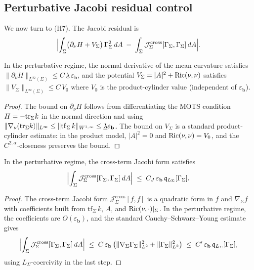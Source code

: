 \subsection{Perturbative Jacobi residual control}

We now turn to (H7). The Jacobi residual is
\[
    \Bigl|\int_\Sigma\bigl(\partial_\nu H + V_\Sigma\bigr)\,\Gamma_\Sigma^2\,dA
    \;-\;\int_\Sigma\mathcal J_\Sigma^{\mathrm{cross}}[\Gamma_\Sigma,\Gamma_\Sigma]\,dA\Bigr|.
\]

\begin{lemma}\label{lem:PerturbativeNuHBound}
In the perturbative regime, the normal derivative of the mean curvature satisfies $\|\partial_\nu H\|_{L^\infty(\Sigma)}\le C\,\underline\lambda\,\varepsilon_{\mathbf b}$, and the potential $V_\Sigma=|A|^2+\mathrm{Ric}(\nu,\nu)$ satisfies $\|V_\Sigma\|_{L^\infty(\Sigma)}\le C\,V_0$ where $V_0$ is the product-cylinder value (independent of $\varepsilon_{\mathbf b}$).
\end{lemma}

\begin{proof}
The bound on $\partial_\nu H$ follows from differentiating the MOTS condition $H=-\mathrm{tr}_\Sigma k$ in the normal direction and using $\|\nabla_\nu(\mathrm{tr}_\Sigma k)\|_{L^\infty}\le\|\mathrm{tf}_\Sigma\,k\|_{W^{1,\infty}}\le\underline\lambda\varepsilon_{\mathbf b}$. The bound on $V_\Sigma$ is a standard product-cylinder estimate: in the product model, $|A|^2=0$ and $\mathrm{Ric}(\nu,\nu)=V_0$, and the $C^{2,\alpha}$-closeness preserves the bound.
\end{proof}

\begin{lemma}\label{lem:PerturbativeCrossBound}
In the perturbative regime, the cross-term Jacobi form satisfies
\begin{equation}\label{eq:PerturbativeCrossBound}
    \Bigl|\int_\Sigma\mathcal J_\Sigma^{\mathrm{cross}}[\Gamma_\Sigma,\Gamma_\Sigma]\,dA\Bigr|
    \;\le\;
    C_J\,\varepsilon_{\mathbf b}\,\mathfrak q_{L_\Sigma}[\Gamma_\Sigma] .
\end{equation}
\end{lemma}

\begin{proof}
The cross-term Jacobi form $\mathcal J_\Sigma^{\mathrm{cross}}[f,f]$ is a quadratic form in $f$ and $\nabla_\Sigma f$ with coefficients built from $\mathrm{tf}_\Sigma\,k$, $A$, and $\mathrm{Ric}(\nu,\cdot)|_\Sigma$. In the perturbative regime, the coefficients are $O(\varepsilon_{\mathbf b})$, and the standard Cauchy--Schwarz--Young estimate gives
\[
    \Bigl|\int_\Sigma\mathcal J_\Sigma^{\mathrm{cross}}[\Gamma_\Sigma,\Gamma_\Sigma]\,dA\Bigr|
    \;\le\;
    C\,\varepsilon_{\mathbf b}\,\bigl(\|\nabla_\Sigma\Gamma_\Sigma\|_{L^2}^2+\|\Gamma_\Sigma\|_{L^2}^2\bigr)
    \;\le\;
    C'\,\varepsilon_{\mathbf b}\,\mathfrak q_{L_\Sigma}[\Gamma_\Sigma],
\]
using $L_\Sigma$-coercivity in the last step.
\end{proof}

